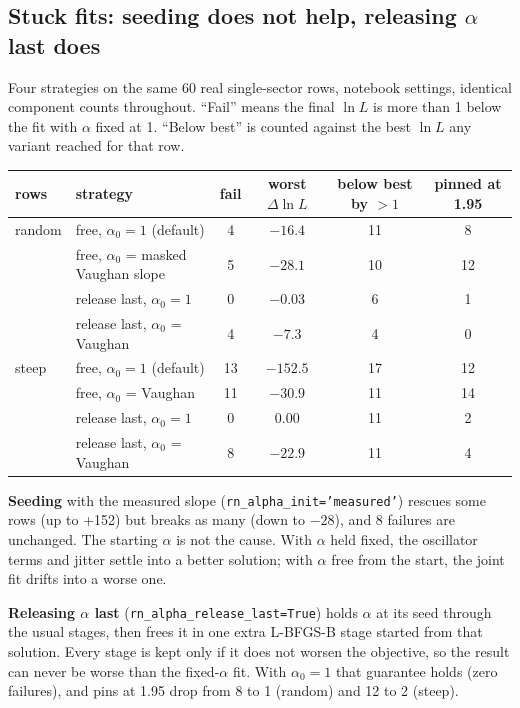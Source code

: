 \documentclass[11pt]{article}
\newcommand{\code}[1]{\texttt{#1}}
\begin{document}
\subsection{Stuck fits: seeding does not help, releasing $\alpha$ last does}

Four strategies on the same 60 real single-sector rows, notebook settings, identical
component counts throughout. ``Fail'' means the final $\ln L$ is more than 1 below the fit
with $\alpha$ fixed at 1. ``Below best'' is counted against the best $\ln L$ any variant
reached for that row.

\begin{center}
\begin{tabular}{llcccc}
\toprule
rows & strategy & fail & worst $\Delta\ln L$ & below best by $>1$ & pinned at 1.95 \\
\midrule
random & free, $\alpha_0=1$ (default)              & 4  & $-16.4$  & 11 & 8 \\
       & free, $\alpha_0$ = masked Vaughan slope    & 5  & $-28.1$  & 10 & 12 \\
       & release last, $\alpha_0=1$                 & 0  & $-0.03$  & 6  & 1 \\
       & release last, $\alpha_0$ = Vaughan         & 4  & $-7.3$   & 4  & 0 \\
\midrule
steep  & free, $\alpha_0=1$ (default)              & 13 & $-152.5$ & 17 & 12 \\
       & free, $\alpha_0$ = Vaughan                 & 11 & $-30.9$  & 11 & 14 \\
       & release last, $\alpha_0=1$                 & 0  & $0.00$   & 11 & 2 \\
       & release last, $\alpha_0$ = Vaughan         & 8  & $-22.9$  & 11 & 4 \\
\bottomrule
\end{tabular}
\end{center}

\textbf{Seeding} with the measured slope (\code{rn\_alpha\_init='measured'}) rescues some
rows (up to +152) but breaks as many (down to $-28$), and 8 failures are unchanged. The
starting $\alpha$ is not the cause. With $\alpha$ held fixed, the oscillator terms and jitter
settle into a better solution; with $\alpha$ free from the start, the joint fit drifts into
a worse one.

\textbf{Releasing $\alpha$ last} (\code{rn\_alpha\_release\_last=True}) holds $\alpha$ at its
seed through the usual stages, then frees it in one extra L-BFGS-B stage started from that
solution. Every stage is kept only if it does not worsen the objective, so the result can
never be worse than the fixed-$\alpha$ fit. With $\alpha_0 = 1$ that guarantee holds (zero
failures), and pins at 1.95 drop from 8 to 1 (random) and 12 to 2 (steep).
\end{document}
